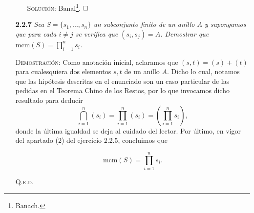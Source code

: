 \documentclass{article}
\newcommand{\mcm}{\text{mcm}}
\begin{document}
\begin{enumerate}
\begin{itemize}
        \vspace{7px}

        \textsc{Solución}: Banal\footnote{Banach.}. $\hfill\square$
    \end{itemize}

    \vspace{12px}

    \item[\textbf{2.2.7}] \textit{Sea $S = \{s_1, ..., s_n\}$ un subconjunto finito de un anillo $A$ y supongamos que para cada $i \neq j$ se verifica que $(s_i, s_j) = A$. Demostrar que $\mcm(S) = \prod_{i=1}^{n} s_i$.}

    \vspace{7px}

    \textsc{Demostración}: Como anotación inicial, aclaramos que $(s, t) = (s) + (t)$ para cualesquiera dos elementos $s, t$ de un anillo $A$. Dicho lo cual, notamos que las hipótesis descritas en el enunciado son un caso particular de las pedidas en el Teorema Chino de los Restos, por lo que invocamos dicho resultado para deducir \[\bigcap_{i = 1}^{n} (s_i) = \prod_{i=1}^{n} (s_i) = \left(\prod_{i=1}^{n} s_i\right),\] donde la última igualdad se deja al cuidado del lector. Por último, en vigor del apartado (2) del ejercicio 2.2.5, concluimos que 

    \[\mcm(S) = \prod_{i=1}^{n}s_i.\]

    \hfill{\textsc{Q.e.d.}}
\end{enumerate}
\end{document}
